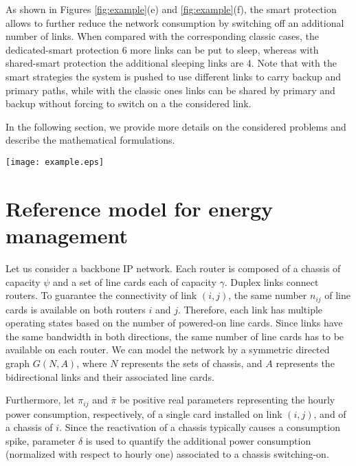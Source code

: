 \documentclass[final,5p,times,twocolumn]{elsarticle}
\begin{document}
As shown in Figures \ref{fig:example}(e) and \ref{fig:example}(f), the smart protection allows to further reduce the network consumption by switching off an additional number of links. 
When compared with the corresponding classic cases, the dedicated-smart protection 6 more links can be put to sleep, whereas with shared-smart protection the additional sleeping links are 4. Note that with the smart strategies the system is pushed to use different links to carry backup and primary paths, while with the classic ones links can be shared by primary and backup without forcing to switch on a the considered link.   
 
In the following section, we provide more details on the considered problems and describe the mathematical formulations.

\begin{figure*}[!p]\centering
  \texttt{[image: example.eps]}
  \caption{Energy consumption minimization vs Resilience requirements.}
\label{fig:example}
\end{figure*}




\section{Reference model for energy management}\label{sec:formulation}

Let us consider a backbone IP network. Each router is composed of a chassis of capacity $\psi$ and a set of line cards each of capacity $\gamma$. Duplex links connect routers. To guarantee the  connectivity of link $(i,j)$, the same number $n_{ij}$ of line cards is available on both routers $i$ and $j$. Therefore, each link has multiple operating states based on the number of powered-on line cards. Since links have the same bandwidth in both directions, the same number of line cards has to be available on each router.
We can model the network by a symmetric directed graph $G(N,A)$, where $N$ represents the sets of chassis, and $A$ represents the bidirectional links and their associated line cards.

Furthermore, let $\pi_{ij}$ and $\bar{\pi}$ be positive real parameters representing the hourly power consumption, respectively, of a single card installed on link $(i,j)$, and of a chassis of $i$. Since the reactivation of a chassis typically causes a consumption spike, parameter $\delta$ is used to quantify the additional power consumption (normalized with respect to hourly one) associated to a chassis switching-on.
\end{document}
